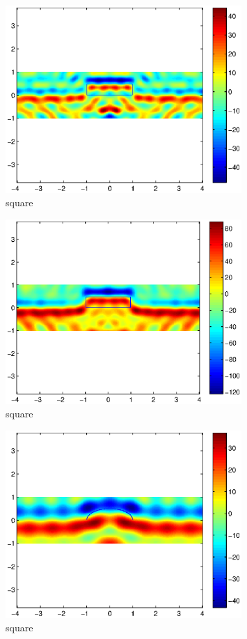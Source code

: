 \documentclass[12pt]{iopart}
\begin{document}
\begin{figure}
	\centering
	\includegraphics[width=0.8\textwidth]{./figure_rough/square_2}
	\caption{square}\label{I1}
\end{figure}
\begin{figure}
	\centering
	\includegraphics[width=0.8\textwidth]{./figure_rough/square_multi}
	\caption{square}\label{I1}
\end{figure}
\begin{figure}
	\centering
	\includegraphics[width=0.8\textwidth]{./figure_rough/hemicircle_1}
	\caption{square}\label{I1}
\end{figure}
\end{document}
